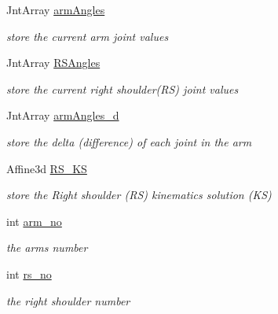 \begin{DoxyCompactItemize}
\mbox{\label{classKDL__IK_a69b2c6c67e16aaec8a87b038361193e2}} 
Jnt\+Array \hyperlink{classKDL__IK_a69b2c6c67e16aaec8a87b038361193e2}{arm\+Angles}
\begin{DoxyCompactList}\small\item\em store the current arm joint values \end{DoxyCompactList}\item 
\mbox{\label{classKDL__IK_a11e0fd66cf9eb471f7041162d5c98004}} 
Jnt\+Array \hyperlink{classKDL__IK_a11e0fd66cf9eb471f7041162d5c98004}{R\+S\+Angles}
\begin{DoxyCompactList}\small\item\em store the current right shoulder(\+R\+S) joint values \end{DoxyCompactList}\item 
\mbox{\label{classKDL__IK_a7fb4557cb3d9e1bc2cd9aab192b824d3}} 
Jnt\+Array \hyperlink{classKDL__IK_a7fb4557cb3d9e1bc2cd9aab192b824d3}{arm\+Angles\+\_\+d}
\begin{DoxyCompactList}\small\item\em store the delta (difference) of each joint in the arm \end{DoxyCompactList}\item 
\mbox{\label{classKDL__IK_a27043e37e4187ab9a69b2fa4ed6743b7}} 
Affine3d \hyperlink{classKDL__IK_a27043e37e4187ab9a69b2fa4ed6743b7}{R\+S\+\_\+\+KS}
\begin{DoxyCompactList}\small\item\em store the Right shoulder (RS) kinematics solution (KS) \end{DoxyCompactList}\item 
\mbox{\label{classKDL__IK_a3c1c05b65f0f06348fc234e928147ca8}} 
int \hyperlink{classKDL__IK_a3c1c05b65f0f06348fc234e928147ca8}{arm\+\_\+no}
\begin{DoxyCompactList}\small\item\em the arm\textquotesingle{}s number \end{DoxyCompactList}\item 
\mbox{\label{classKDL__IK_ade06f6d5bdbce0b39b12061fb767dafa}} 
int \hyperlink{classKDL__IK_ade06f6d5bdbce0b39b12061fb767dafa}{rs\+\_\+no}
\begin{DoxyCompactList}\small\item\em the right shoulder number \end{DoxyCompactList}\item 

\end{DoxyCompactItemize}
